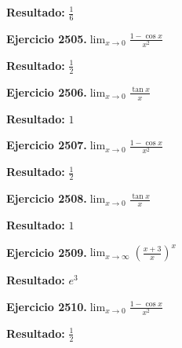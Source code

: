 \documentclass[10pt,a4paper]{article}
\begin{document}
\begin{solbox}
\textbf{Resultado:} \(\displaystyle \frac{1}{6}\)
\end{solbox}

\newpage
\begin{ejbox}
\textbf{Ejercicio 2505.}\quad $\lim_{x\to 0} \frac{1-\cos x}{x^2}$
\end{ejbox}

\begin{solbox}
\textbf{Resultado:} \(\displaystyle \frac{1}{2}\)
\end{solbox}

\begin{ejbox}
\textbf{Ejercicio 2506.}\quad $\lim_{x\to 0} \frac{\tan x}{x}$
\end{ejbox}

\begin{solbox}
\textbf{Resultado:} \(\displaystyle 1\)
\end{solbox}

\begin{ejbox}
\textbf{Ejercicio 2507.}\quad $\lim_{x\to 0} \frac{1-\cos x}{x^2}$
\end{ejbox}

\begin{solbox}
\textbf{Resultado:} \(\displaystyle \frac{1}{2}\)
\end{solbox}

\newpage
\begin{ejbox}
\textbf{Ejercicio 2508.}\quad $\lim_{x\to 0} \frac{\tan x}{x}$
\end{ejbox}

\begin{solbox}
\textbf{Resultado:} \(\displaystyle 1\)
\end{solbox}

\begin{ejbox}
\textbf{Ejercicio 2509.}\quad $\lim_{x\to \infty} \left(\frac{x+3}{x}\right)^{x}$
\end{ejbox}

\begin{solbox}
\textbf{Resultado:} \(\displaystyle e^{3}\)
\end{solbox}

\begin{ejbox}
\textbf{Ejercicio 2510.}\quad $\lim_{x\to 0} \frac{1-\cos x}{x^2}$
\end{ejbox}

\begin{solbox}
\textbf{Resultado:} \(\displaystyle \frac{1}{2}\)
\end{solbox}
\end{document}
